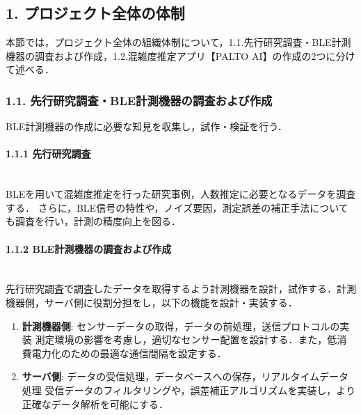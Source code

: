 \subsection*{1. プロジェクト全体の体制}
本節では，プロジェクト全体の組織体制について，1.1.先行研究調査・BLE計測機器の調査および作成，1.2.混雑度推定アプリ【PALTO AI】の作成の2つに分けて述べる．

\subsubsection*{1.1. 先行研究調査・BLE計測機器の調査および作成}
BLE計測機器の作成に必要な知見を収集し，試作・検証を行う．

\paragraph*{1.1.1 先行研究調査}\mbox{}\\
\indent BLEを用いて混雑度推定を行った研究事例，人数推定に必要となるデータを調査する．
	さらに，BLE信号の特性や，ノイズ要因，測定誤差の補正手法についても調査を行い，計測の精度向上を図る．
    
\paragraph*{1.1.2 BLE計測機器の調査および作成}\mbox{}\\
\indent 先行研究調査で調査したデータを取得するよう計測機器を設計，試作する．計測機器側，サーバ側に役割分担をし，以下の機能を設計・実装する．
   
\begin{enumerate}
    \item {\bfseries 計測機器側}: センサーデータの取得，データの前処理，送信プロトコルの実装
    測定環境の影響を考慮し，適切なセンサー配置を設計する．また，低消費電力化のための最適な通信間隔を設定する．
    \item {\bfseries サーバ側}: データの受信処理，データベースへの保存，リアルタイムデータ処理
    受信データのフィルタリングや，誤差補正アルゴリズムを実装し，より正確なデータ解析を可能にする．
\end{enumerate}

